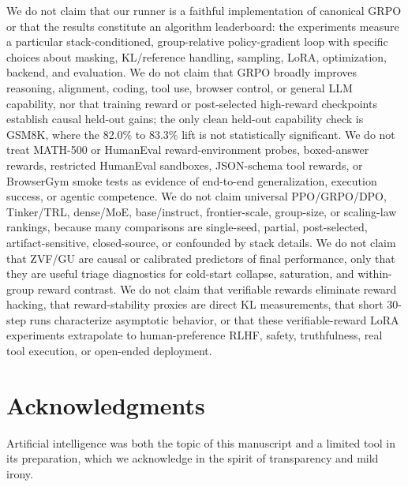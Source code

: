 \documentclass[12pt,a4paper]{report}
\begin{document}
We do not claim that our runner is a faithful implementation of canonical GRPO
or that the results constitute an algorithm leaderboard: the experiments measure
a particular stack-conditioned, group-relative policy-gradient loop with specific
choices about masking, KL/reference handling, sampling, LoRA, optimization,
backend, and evaluation.  We do not claim that GRPO broadly improves reasoning,
alignment, coding, tool use, browser control, or general LLM capability, nor
that training reward or post-selected high-reward checkpoints establish causal
held-out gains; the only clean held-out capability check is GSM8K, where the
82.0\% to 83.3\% lift is not statistically significant.  We do not treat
MATH-500 or HumanEval reward-environment probes, boxed-answer rewards,
restricted HumanEval sandboxes, JSON-schema tool rewards, or BrowserGym smoke
tests as evidence of end-to-end generalization, execution success, or agentic
competence.  We do not claim universal PPO/GRPO/DPO, Tinker/TRL, dense/MoE,
base/instruct, frontier-scale, group-size, or scaling-law rankings, because
many comparisons are single-seed, partial, post-selected, artifact-sensitive,
closed-source, or confounded by stack details.  We do not claim that ZVF/GU
are causal or calibrated predictors of final performance, only that they are
useful triage diagnostics for cold-start collapse, saturation, and within-group
reward contrast.  We do not claim that verifiable rewards eliminate reward
hacking, that reward-stability proxies are direct KL measurements, that short
30-step runs characterize asymptotic behavior, or that these verifiable-reward
LoRA experiments extrapolate to human-preference RLHF, safety, truthfulness,
real tool execution, or open-ended deployment.

\section*{Acknowledgments}
Artificial intelligence was both the topic of this manuscript and a limited tool in its preparation, which we acknowledge in the spirit of transparency and mild irony.


\end{document}
